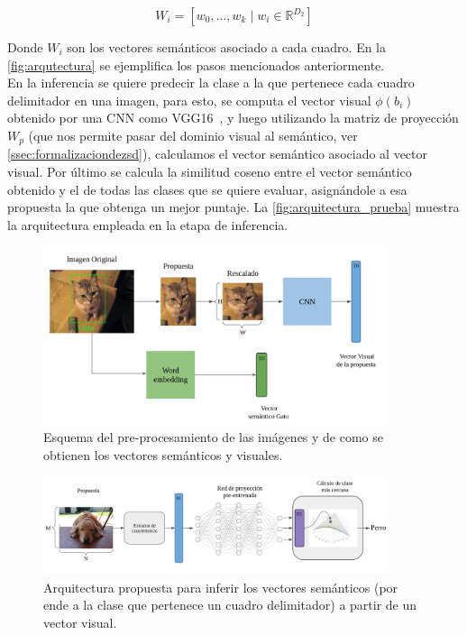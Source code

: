 \[W_i = [w_0,...,w_k \mid w_i \in \mathbb{R}^{D_2}]\]

Donde $W_i$ son los vectores semánticos asociado a cada cuadro. En la \autoref{fig:arqutectura} se ejemplifica los pasos mencionados anteriormente.\\


En la inferencia se quiere predecir la clase a la que pertenece cada cuadro delimitador en una imagen, para esto, se computa el vector visual $\phi(b_i)$ obtenido por una CNN como VGG16~\cite{simonyan2014very}, y luego utilizando la matriz de proyección $W_p$ (que nos permite pasar del dominio visual al semántico, ver \autoref{ssec:formalizaciondezsd}), calculamos el vector semántico asociado al vector visual. Por último se calcula la similitud coseno entre el vector semántico obtenido y el de todas las clases que se quiere evaluar, asignándole a esa propuesta la que obtenga un mejor puntaje. La \autoref{fig:arquitectura_prueba} muestra la arquitectura empleada en la etapa de inferencia.

\begin{figure}[H]
	\centering
	\includegraphics[width=0.9\textwidth]{img/arquitectura.png}
	\caption{Esquema del pre-procesamiento de las imágenes y de como se obtienen los vectores semánticos y visuales.}
	\label{fig:arqutectura}
\end{figure}

\begin{figure}[H]
	\centering
	\includegraphics[width=0.9\textwidth]{img/arquitectura_prueba.png}
	\caption{Arquitectura propuesta para inferir los vectores semánticos (por ende a la clase que pertenece un cuadro delimitador) a partir de un vector visual.}
	\label{fig:arquitectura_prueba}
\end{figure}

